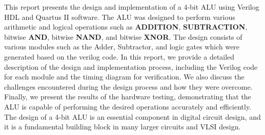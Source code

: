 This report presents the design and implementation of a
4-bit ALU using Verilog HDL and Quartus II software.
The ALU was designed to perform various arithmetic
and logical operations such as \textbf{ADDITION}, \textbf{SUBTRACTION},
bitwise \textbf{AND}, bitwise \textbf{NAND}, and bitwise \textbf{XNOR}.
The design consists of various modules such as the Adder, Subtractor,
and logic gates which were generated based on the verilog code.
In this report, we provide a detailed description of the design and implementation process,
including the Verilog code for each module and the timing diagram for verification.
We also discuss the challenges encountered during the design process and how they were overcome.
Finally, we present the results of the hardware testing, demonstrating that
the ALU is capable of performing the desired operations accurately and efficiently.
The design of a 4-bit ALU is an essential component in digital circuit design,
and it is a fundamental building block in many larger circuits and VLSI design.